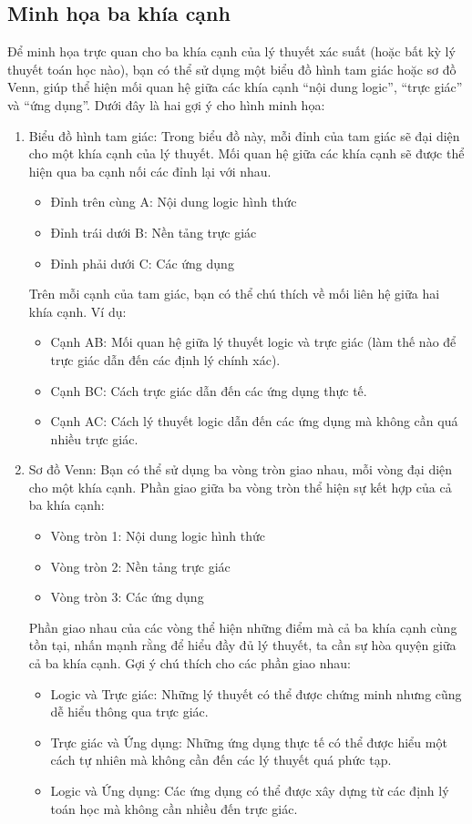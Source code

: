 \subsection*{Minh họa ba khía cạnh}
Để minh họa trực quan cho ba khía cạnh của lý thuyết xác suất (hoặc bất kỳ lý thuyết toán học nào), bạn có thể sử dụng một biểu đồ hình tam giác hoặc sơ đồ Venn, giúp thể hiện mối quan hệ giữa các khía cạnh ``nội dung logic'', ``trực giác'' và ``ứng dụng''. Dưới đây là hai gợi ý cho hình minh họa:
\begin{enumerate}
    \item Biểu đồ hình tam giác:  Trong biểu đồ này, mỗi đỉnh của tam giác sẽ đại diện cho một khía cạnh của lý thuyết. Mối quan hệ giữa các khía cạnh sẽ được thể hiện qua ba cạnh nối các đỉnh lại với nhau.
    \begin{itemize}
        \item Đỉnh trên cùng A: Nội dung logic hình thức
        \item Đỉnh trái dưới B: Nền tảng trực giác
        \item Đỉnh phải dưới C: Các ứng dụng
    \end{itemize}
    Trên mỗi cạnh của tam giác, bạn có thể chú thích về mối liên hệ giữa hai khía cạnh. Ví dụ:
    \begin{itemize}
        \item Cạnh AB: Mối quan hệ giữa lý thuyết logic và trực giác (làm thế nào để trực giác dẫn đến các định lý chính xác).
        \item Cạnh BC: Cách trực giác dẫn đến các ứng dụng thực tế.
        \item Cạnh AC: Cách lý thuyết logic dẫn đến các ứng dụng mà không cần quá nhiều trực giác.
    \end{itemize}

    \item Sơ đồ Venn: Bạn có thể sử dụng ba vòng tròn giao nhau, mỗi vòng đại diện cho một khía cạnh. Phần giao giữa ba vòng tròn thể hiện sự kết hợp của cả ba khía cạnh:
    \begin{itemize}
        \item Vòng tròn 1: Nội dung logic hình thức
        \item Vòng tròn 2: Nền tảng trực giác
        \item Vòng tròn 3: Các ứng dụng
    \end{itemize}
    Phần giao nhau của các vòng thể hiện những điểm mà cả ba khía cạnh cùng tồn tại, nhấn mạnh rằng để hiểu đầy đủ lý thuyết, ta cần sự hòa quyện giữa cả ba khía cạnh. Gợi ý chú thích cho các phần giao nhau:
    \begin{itemize}
        \item Logic và Trực giác: Những lý thuyết có thể được chứng minh nhưng cũng dễ hiểu thông qua trực giác.
        \item Trực giác và Ứng dụng: Những ứng dụng thực tế có thể được hiểu một cách tự nhiên mà không cần đến các lý thuyết quá phức tạp.
        \item Logic và Ứng dụng: Các ứng dụng có thể được xây dựng từ các định lý toán học mà không cần nhiều đến trực giác.
    \end{itemize}
\end{enumerate}
